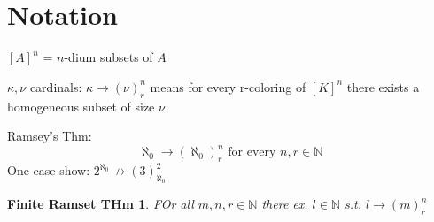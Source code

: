 \documentclass[12pt]{article}
\newcommand{\Nat}{\ensuremath{\mathbb{N}}}
\begin{document}
\section{Notation}

$[A]^n$ = $n$-dium subsets of $A$

$\kappa, \nu$ cardinals:
$\kappa \rightarrow (\nu)^n_r$ means
for every r-coloring of $[K]^n$ there exists a homogeneous subset of size $\nu$

Ramsey's Thm:
\[
\aleph_0 \rightarrow (\aleph_0)^n_r \text{ for every $n, r \in \Nat$}
\]
One case show:
$2^{\aleph_0} \not \rightarrow (3)^2_{\aleph_0}$

\newtheorem*{finiteram}{Finite Ramset THm}
\begin{finiteram}
  FOr all $m, n, r \in \Nat$ there ex. $l \in \Nat$ s.t. $l \rightarrow (m)^n_r$ 
\end{finiteram}
\end{document}
